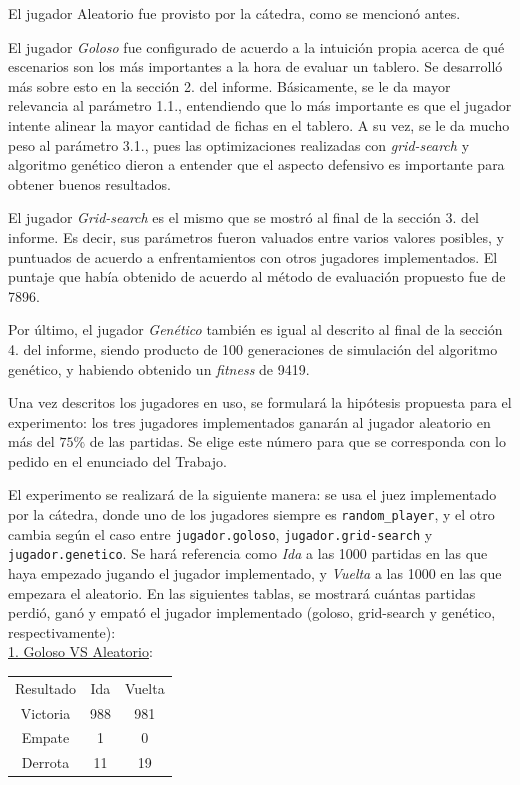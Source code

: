 \documentclass[12pt,a4paper]{article}
\begin{document}
    El jugador Aleatorio fue provisto por la cátedra, como se mencionó antes.
    
    El jugador \textit{Goloso} fue configurado de acuerdo a la intuición propia acerca de qué escenarios son los más importantes a la hora de evaluar un tablero. Se desarrolló más sobre esto en la sección 2. del informe. Básicamente, se le da mayor relevancia al parámetro 1.1., entendiendo que lo más importante es que el jugador intente alinear la mayor cantidad de fichas en el tablero. A su vez, se le da mucho peso al parámetro 3.1., pues las optimizaciones realizadas con \textit{grid-search} y algoritmo genético dieron a entender que el aspecto defensivo es importante para obtener buenos resultados.
    
    El jugador \textit{Grid-search} es el mismo que se mostró al final de la sección 3. del informe. Es decir, sus parámetros fueron valuados entre varios valores posibles, y puntuados de acuerdo a enfrentamientos con otros jugadores implementados. El puntaje que había obtenido de acuerdo al método de evaluación propuesto fue de 7896.
    
    Por último, el jugador \textit{Genético} también es igual al descrito al final de la sección 4. del informe, siendo producto de 100 generaciones de simulación del algoritmo genético, y habiendo obtenido un \textit{fitness} de 9419.
    
    Una vez descritos los jugadores en uso, se formulará la hipótesis propuesta para el experimento: los tres jugadores implementados ganarán al jugador aleatorio en más del $75\%$ de las partidas. Se elige este número para que se corresponda con lo pedido en el enunciado del Trabajo.
    
    El experimento se realizará de la siguiente manera: se usa el juez implementado por la cátedra, donde uno de los jugadores siempre es \texttt{random\_player}, y el otro cambia según el caso entre \texttt{jugador.goloso}, \texttt{jugador.grid-search} y \texttt{jugador.genetico}. Se hará referencia como \textit{Ida} a las 1000 partidas en las que haya empezado jugando el jugador implementado, y \textit{Vuelta} a las 1000 en las que empezara el aleatorio. En las siguientes tablas, se mostrará cuántas partidas perdió, ganó y empató el jugador implementado (goloso, grid-search y genético, respectivamente): \\[5pt]

    \underline{1. Goloso VS Aleatorio}:
    \begin{center}
		\begin{tabular}{ | c || c | c | }
		\hline
		Resultado &  Ida &  Vuelta \\ \hhline{|=#=|=|}
		    Victoria &  988 &  981 \\ \hline
		    Empate &  1 &  0 \\ \hline
		    Derrota &  11 &  19 \\ \hline
		\end{tabular}
    \end{center}
    
\end{document}
